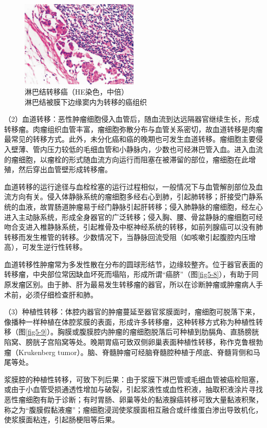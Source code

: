 \begin{figure}[!htbp]
  \centering
  \includegraphics[width=0.5\textwidth]{./images/Image00074.jpg}
  \caption{淋巴结转移癌（HE染色，中倍）\\ {\small 淋巴结被膜下边缘窦内为转移的癌组织}}
  \label{fig5-7}
\end{figure}



（2）血道转移：恶性肿瘤细胞侵入血管后，随血流到达远隔器官继续生长，形成转移瘤。肉瘤组织血管丰富，瘤细胞弥散分布与血管关系密切，故血道转移是肉瘤最常见的转移方式。此外，未分化癌和癌的晚期也可发生血道转移。瘤细胞主要侵入壁薄、管内压力较低的毛细血管和小静脉内，少数也可经淋巴管入血。进入血流的瘤细胞，以瘤栓的形式随血流方向运行而阻塞在被滞留的部位，瘤细胞在此增殖，然后穿出血管壁形成转移瘤。

血道转移的运行途径与血栓栓塞的运行过程相似，一般情况下与血管解剖部位及血流方向有关。侵入体静脉系统的瘤细胞多经右心到肺，引起肺转移；肝接受门静系统的血液，故胃肠道肿瘤易于经门静脉引起肝转移；侵入肺静脉的瘤细胞，经左心进入主动脉系统，形成全身器官的广泛转移；侵入胸、腰、骨盆静脉的瘤细胞可经吻合支进入椎静脉系统，引起椎骨及中枢神经系统的转移，如前列腺癌可以没有肺转移而发生椎管的转移。少数情况下，当静脉回流受阻（如咳嗽引起腹腔内压增高），可发生逆行性转移。

血道转移性肿瘤常为多发性散在分布的圆球形结节，边缘较整齐。位于器官表面的转移瘤，中央部位常因缺血坏死而塌陷，形成所谓“癌脐”（图\ref{fig5-8}），有助于同原发瘤区别。由于肺、肝为最易发生转移瘤的器官，所以在诊断肿瘤或肿瘤病人手术前，必须仔细检查肝和肺。

（3）种植性转移：体腔内器官的肿瘤蔓延至器官浆膜面时，瘤细胞可脱落下来，像播种一样种植在体腔浆膜的表面，形成许多转移瘤，这种转移方式称为种植性转移（图\ref{fig5-9}）。胸膜或腹膜腔内肿瘤的瘤细胞脱落后可种植到肋膈角、直肠膀胱陷窝、膀胱子宫陷窝等处。晚期胃癌可致双侧卵巢表面种植性转移，称作克鲁根勃瘤（Krukenberg
tumor）。脑、脊髓肿瘤可经脑脊髓腔种植于颅底、脊髓背侧和马尾等处。

浆膜腔的种植性转移，可致下列后果：由于浆膜下淋巴管或毛细血管被癌栓阻塞，或由于小血管受损通透性增加与破裂，引起浆液性或血性积液，抽取积液涂片寻找恶性瘤细胞有助于诊断；有时胃肠、卵巢等处的黏液腺癌转移可致大量黏液积聚，称之为“腹膜假黏液瘤”；瘤细胞浸润使浆膜面相互融合或纤维蛋白渗出导致机化，使浆膜面粘连，引起肠梗阻等后果。

